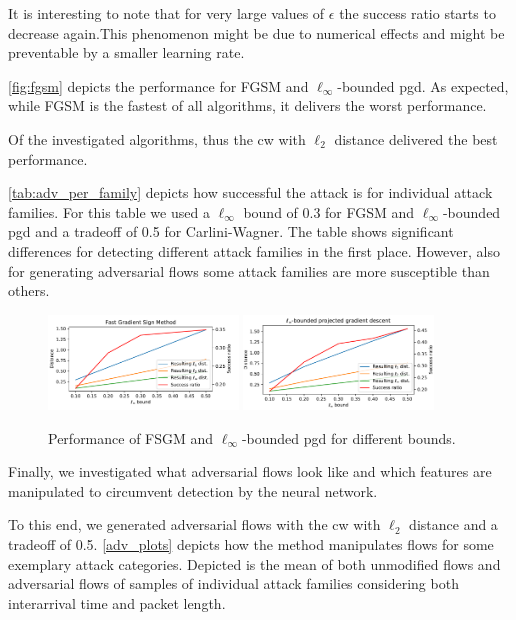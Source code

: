 \documentclass[conference]{IEEEtran}
\begin{document}
It is interesting to note that for very large values of $\epsilon$ the success ratio starts to decrease again.This phenomenon might be due to numerical effects and might be preventable by a smaller learning rate.


\autoref{fig:fgsm} depicts the performance for FGSM and $\ell_\infty$-bounded \gls{pgd}. As expected, while FGSM is the fastest of all algorithms, it delivers the worst performance.

Of the investigated algorithms, thus the \gls{cw} with $\ell_2$ distance delivered the best performance.

\autoref{tab:adv_per_family} depicts how successful the attack is for individual attack families. For this table we used a $\ell_\infty$ bound of 0.3 for FGSM and $\ell_\infty$-bounded \gls{pgd} and a tradeoff of 0.5 for Carlini-Wagner. The table shows significant differences for detecting different attack families in the first place. However, also for generating adversarial flows some attack families are more susceptible than others.

\begin{figure}
\includegraphics[width=0.45\textwidth]{adv_plots/fgsm.pdf}
\includegraphics[width=0.45\textwidth]{adv_plots/l_inf_pgd.pdf}
\caption{Performance of FSGM and $\ell_\infty$-bounded \gls{pgd} for different bounds.}
\label{fig:fgsm}
\end{figure}

Finally, we investigated what adversarial flows look like and which features are manipulated to circumvent detection by the neural network.

To this end, we generated adversarial flows with the \gls{cw} with $\ell_2$ distance and a tradeoff of 0.5. \autoref{adv_plots} depicts how the method manipulates flows for some exemplary attack categories. Depicted is the mean of both unmodified flows and adversarial flows  of samples of individual attack families considering both interarrival time and packet length.
\end{document}
